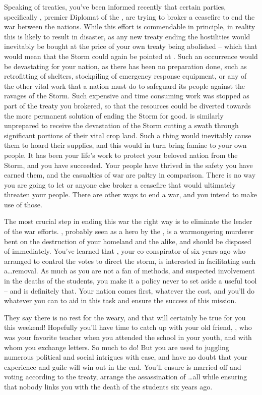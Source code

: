 \documentclass[char]{GL2020}
\begin{document}
Speaking of treaties, you’ve been informed recently that certain parties, specifically \cHeadDiplomat{}, premier Diplomat of the \pShip{}, are trying to broker a ceasefire to end the war between the nations. While this effort is commendable in principle, in reality this is likely to result in disaster, as any new treaty ending the hostilities would inevitably be bought at the price of your own treaty being abolished -- which that would mean that the Storm could again be pointed at \pTech{}. Such an occurrence would be devastating for your nation, as there has been no preparation done, such as retrofitting of shelters, stockpiling of emergency response equipment, or any of the other vital work that a nation must do to safeguard its people against the ravages of the Storm. Such expensive and time consuming work was stopped as part of the treaty you brokered, so that the resources could be diverted towards the more permanent solution of ending the Storm for good. \pFarm{} is similarly unprepared to receive the devastation of the Storm cutting a swath through significant portions of their vital crop land. Such a thing would inevitably cause them to hoard their supplies, and this would in turn bring famine to your own people. It has been your life’s work to protect your beloved nation from the Storm, and you have succeeded. Your people have thrived in the safety you have earned them, and the casualties of war are paltry in comparison. There is no way you are going to let \cHeadDiplomat{} or anyone else broker a ceasefire that would ultimately threaten your people.  There are other ways to end a war, and you intend to make use of those.

The most crucial step in ending this war the right way is to eliminate the leader of the \pShip{} war efforts. \cLoud{}, probably seen as a hero by the \pShippies{}, is a warmongering murderer bent on the destruction of your homeland and the \pFarm{} alike, and should be disposed of immediately. You’ve learned that \cEvil{}, your co-conspirator of six years ago who arranged to control the votes to direct the storm, is interested in facilitating such a\ldots removal.  As much as you are not a fan of \cEvil{\their} methods, and \cEvil{\their} suspected involvement in the deaths of the students, you make it a policy never to set aside a useful tool -- and \cEvil{} is definitely that. Your nation comes first, whatever the cost, and you’ll do whatever you can to aid \cEvil{} in this task and ensure the success of this mission.

They say there is no rest for the weary, and that will certainly be true for you this weekend!  Hopefully you’ll have time to catch up with your old friend, \cPrincipal{}, who was your favorite teacher when you attended the school in your youth, and with whom you exchange letters. So much to do! But you are used to juggling numerous political and social intrigues with ease, and have no doubt that your experience and guile will win out in the end.  You’ll ensure \cHeir{} is married off and voting according to the treaty, arrange the assassination of \cLoud{}\ldots all while ensuring that nobody links you with the death of the students six years ago.
\end{document}
